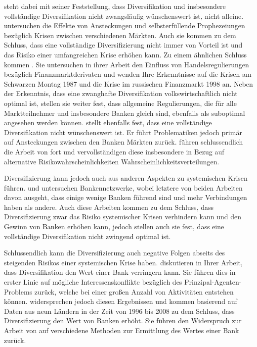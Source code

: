 steht dabei mit seiner Feststellung, dass Diversifikation und insbesondere vollständige Diversifikation nicht zwangsläufig wünschenswert ist, nicht alleine. \Textcite{Goldstein-2004} \zb{} untersuchen die Effekte von Ansteckungen und selbsterfüllende Prophezeiungen bezüglich Krisen zwischen verschiedenen Märkten. Auch sie kommen zu dem Schluss, dass eine vollständige Diversifizierung nicht immer von Vorteil ist und das Risiko einer umfangreichen Krise erhöhen kann. Zu einem ähnlichen Schluss kommen \textcite{Danielsson-2003}. Sie untersuchen in ihrer Arbeit den Einfluss von Handelsregulierungen bezüglich Finanzmarktderivaten und wenden Ihre Erkenntnisse auf die Krisen am Schwarzen Montag 1987 und die Krise im russischen Finanzmarkt 1998 an. Neben der Erkenntnis, dass eine zwanghafte Diversifikation volkswirtschaftlich nicht optimal ist, stellen sie weiter fest, dass allgemeine Regulierungen, die für alle Marktteilnehmer und insbesondere Banken gleich sind, ebenfalls als suboptimal angesehen werden können. \Textcite{Stiglitz-2010a,Stiglitz-2010b} stellt ebenfalls fest, dass eine vollständige Diversifikation nicht wünschenswert ist. Er führt Problematiken jedoch primär auf Ansteckungen zwischen den Banken \bzw{} Märkten zurück. \Textcite{Ibragimov-2011} führen schlussendlich die Arbeit von \citeauthor{Wagner-2010} fort und vervollständigen diese insbesondere in Bezug auf alternative Risikowahrscheinlichkeiten \bzw{} Wahrscheinlichkeitsverteilungen. 

Diversifizierung kann jedoch auch aus anderen Aspekten zu systemischen Krisen führen. \Textcite{Battiston-2012} und \textcite{Teteryatnikova-2014} \zb{} untersuchen Bankennetzwerke, wobei letztere von beiden Arbeiten davon ausgeht, dass einige wenige Banken führend sind und mehr Verbindungen haben als andere. Auch diese Arbeiten kommen zu dem Schluss, dass Diversifizierung zwar das Risiko systemischer Krisen verhindern kann und den Gewinn von Banken erhöhen kann, jedoch stellen auch sie fest, dass eine vollständige Diversifikation nicht zwingend optimal ist.

Schlussendlich kann die Diversifizierung auch negative Folgen abseits des steigenden Risikos einer systemischen Krise haben. \Textcite{Laeven-2007} diskutieren \zb{} in Ihrer Arbeit, dass Diversifikation den Wert einer Bank verringern kann. Sie führen dies in erster Linie auf mögliche Interessenskonflikte bezüglich des Prinzipal-Agenten-Problems zurück, welche bei einer großen Anzahl von Aktivitäten entstehen können. \Textcite{Elsas-2010} widersprechen jedoch diesen Ergebnissen und kommen basierend auf Daten aus neun Ländern in der Zeit von 1996 bis 2008 zu dem Schluss, dass Diversifizierung den Wert von Banken erhöht. Sie führen den Widerspruch zur Arbeit von \citeauthor{Laeven-2007} auf verschiedene Methoden zur Ermittlung des Wertes einer Bank zurück.

